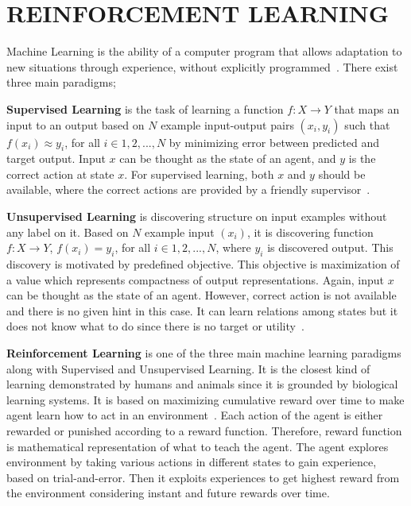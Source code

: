 \chapter{REINFORCEMENT LEARNING}
\label{chap:rl_chap}

Machine Learning is the ability of a computer program that allows 
adaptation to new situations through experience, 
without explicitly programmed~\cite{mitchell_machine_1997}. 
There exist three main paradigms; 

\textbf{Supervised Learning} is the task of learning a function $f \colon X \rightarrow Y$ 
that maps an input to an output based on $N$ example input-output pairs $(x_i,y_i)$ 
such that $ f(x_i) \approx y_i$, for all $i \in {1,2,...,N}$ 
by minimizing error between predicted and target output. 
Input $x$ can be thought as the state of an agent, and $y$ is the correct action at state $x$. 
For supervised learning, both $x$ and $y$ should be available, 
where the correct actions are provided by a friendly supervisor~\cite{russell_artificial_nodate}. 

\textbf{Unsupervised Learning} is discovering structure on input examples without any label on it. 
Based on $N$ example input $(x_i)$, 
it is discovering function $f \colon X \rightarrow Y$, $ f(x_i) = y_i$, for all $i \in {1,2,...,N} $, 
where $y_i$ is discovered output. 
This discovery is motivated by predefined objective. 
This objective is maximization of a value which represents compactness of output representations. 
Again, input $x$ can be thought as the state of an agent. 
However, correct action is not available and there is no given hint in this case. 
It can learn relations among states but it does not know what to do 
since there is no target or utility~\cite{russell_artificial_nodate}.
 
\textbf{Reinforcement Learning} is one of the three main machine learning paradigms along with Supervised and Unsupervised Learning. 
It is the closest kind of learning demonstrated by humans and animals 
since it is grounded by biological learning systems. 
It is based on maximizing cumulative reward over time to make agent 
learn how to act in an environment~\cite{sutton_reinforcement_1998}. 
Each action of the agent is either rewarded or punished according to a reward function. 
Therefore, reward function is mathematical representation of what to teach the agent. 
The agent explores environment by taking various actions in different states to gain experience, based on trial-and-error. 
Then it exploits experiences to get highest reward from the environment considering instant and future rewards over time. 

